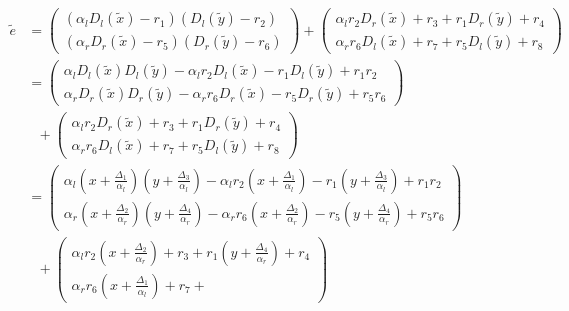 \begin{align*}
  \widetilde{e} & =
  \begin{pmatrix}
    (\alpha_l D_l(\widetilde{x})-r_1)
    (         D_l(\widetilde{y})-r_2) \\
    (\alpha_r D_r(\widetilde{x})-r_5)
    (         D_r(\widetilde{y})-r_6)
  \end{pmatrix}
  +
  \begin{pmatrix}
    \alpha_lr_2 D_r(\widetilde{x}) + r_3 +
    r_1         D_r(\widetilde{y}) + r_4 \\
    \alpha_rr_6 D_l(\widetilde{x}) + r_7 +
    r_5         D_l(\widetilde{y}) + r_8
  \end{pmatrix} \\
%
  & =
  \begin{pmatrix}
    \alpha_l     D_l(\widetilde{x}) D_l(\widetilde{y})
    -\alpha_lr_2 D_l(\widetilde{x})
    -r_1         D_l(\widetilde{y})
    +r_1r_2 \\
    \alpha_r     D_r(\widetilde{x}) D_r(\widetilde{y})
    -\alpha_rr_6 D_r(\widetilde{x})
    -r_5         D_r(\widetilde{y})
    +r_5r_6
  \end{pmatrix} \\
  &\ \ \ +
  \begin{pmatrix}
    \alpha_lr_2 D_r(\widetilde{x}) + r_3 +
    r_1         D_r(\widetilde{y}) + r_4 \\
    \alpha_rr_6 D_l(\widetilde{x}) + r_7 +
    r_5         D_l(\widetilde{y}) + r_8
  \end{pmatrix} \\
%
  & =
  \begin{pmatrix}
    \alpha_l     \left(x + \frac{\Delta_1}{\alpha_l}\right)
                 \left(y + \frac{\Delta_3}{\alpha_l}\right)
    -\alpha_lr_2 \left(x + \frac{\Delta_1}{\alpha_l}\right)
    -r_1         \left(y + \frac{\Delta_3}{\alpha_l}\right)
    +r_1r_2 \\
    \alpha_r     \left(x + \frac{\Delta_2}{\alpha_r}\right)
                 \left(y + \frac{\Delta_4}{\alpha_r}\right)
    -\alpha_rr_6 \left(x + \frac{\Delta_2}{\alpha_r}\right)
    -r_5         \left(y + \frac{\Delta_4}{\alpha_r}\right)
    + r_5r_6
  \end{pmatrix} \\
  &\ \ \ +
  \begin{pmatrix}
    \alpha_lr_2  \left(x + \frac{\Delta_2}{\alpha_r}\right) + r_3 +
    r_1          \left(y + \frac{\Delta_4}{\alpha_r}\right) + r_4 \\
    \alpha_rr_6  \left(x + \frac{\Delta_1}{\alpha_l}\right) + r_7 +

\end{pmatrix}
\end{align*}
